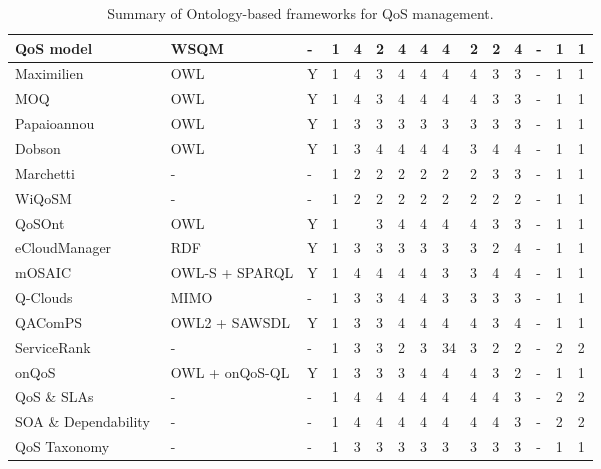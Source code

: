 \begin{sidewaystable}[!ht]
\begin{center}
\begin{tabular}[c]{|p{2.5cm}|p{1.2cm}|p{1.2cm}|p{1.2cm}|p{0.8cm}|p{0.8cm}|p{0.8cm}|p{0.8cm}|p{1.1cm}|p{1.1cm}|p{1.1cm}|p{1.1cm}|p{1.1cm}|p{1.1cm}|p{1.1cm}|}
   QoS model~\cite{Mabrouk:2009:SEQ:1564601.1564724} & WSQM & - &1 &4 &2 &4 &4 &4 &2 &2 &4 &- &1 &1 \\ \hline
   Maximilien~\cite{Maximilien:2004:FOD:1024866.1025003} & OWL & Y & 1&4 &3 &4 &4 &4 &4 &3 &3 &- &1 &1 \\ \hline
   MOQ~\cite{Kim:2007:MWS:1359823.1359827} & OWL & Y & 1&4 &3 &4 &4 &4 &4 &3 &3 &- &1 &1 \\ \hline
   Papaioannou\cite{Papaioannou:2006:QOL:1129027.1129054} & OWL & Y & 1&3 &3 &3 &3 &3 &3 &3 &3 &- &1 &1 \\ \hline
   Dobson~\cite{Dobson:2006:TUQ:1173701.1174285} & OWL & Y & 1&3 &4 &4 &4 &4 &3 &4 &4 &- &1 &1 \\ \hline
   Marchetti~\cite{Marchetti:2004:QMM:1013367.1013377} & - & - & 1 &2 &2 &2 &2 &2 &2 &3 &3 &- &1 &1 \\ \hline
   WiQoSM~\cite{Resta:2008:WIQ:1340085.1340215} & - & - & 1 &2 &2 &2 &2 &2 &2 &2 &2 &- &1 &1 \\ \hline
   QoSOnt~\cite{Dobson:2005:QQO:1090946.1091252} & OWL & Y & 1&  &3 &4 &4 &4 &4 &3 &3 &- &1 &1 \\ \hline
   eCloudManager~\cite{Haase:2010:STE:1940334.1940342} & RDF & Y & 1& 3 &3 &3 &3 &3 &3 &2 &4 &- &1 &1 \\ \hline
   mOSAIC~\cite{Cretella:2012:UMS:2428736.2428805} & OWL-S + SPARQL & Y & 1 & 4 &4 &4 &4 &3 &3 &4 &4 &- &1 &1 \\ \hline
   Q-Clouds~\cite{Nathuji:2010:QMP:1755913.1755938} & MIMO & - & 1 & 3 &3 &4 &4 &3 &3 &3 &3 &- &1 &1 \\ \hline
   QAComPS~\cite{dewqacomps} & OWL2 + SAWSDL & Y & 1 & 3 &3 &4 &4 &4 &4 &3 &4 &- &1 &1 \\ \hline
   ServiceRank~\cite{Wu:2009:CQS:1696051.1696105} & - & - & 1 & 3 &3 &2 &3 &34 &3 &2 &2 &- &2 &2 \\ \hline
   onQoS~\cite{Damiano:2009:OQL:1506129.1506143} & OWL + onQoS-QL & Y & 1 & 3 &3 &3 &4 &4 &4 &3 &2 &- &1 &1 \\ \hline
   QoS \& SLAs~\cite{stantchev2009negotiating} & - & - & 1 & 4 & 4 &4 &4 &4 &4 &4 &3 &- &2 &2 \\ \hline
   SOA \& Dependability~\cite{stantchev2011addressing} & - & - & 1 & 4 & 4 &4 &4 &4 &4 &4 &3 &- &2 &2 \\ \hline   
   QoS Taxonomy~\cite{qos-taxonomy} & - & - & 1 & 3 & 3 &3 &3 &3 &3 &3 &3 &- &1 &1 \\ \hline   
\hline
\end{tabular}
\caption{Summary of Ontology-based frameworks for QoS management.}\label{summary-features-qos-models}
  \end{center}
\end{sidewaystable} 

